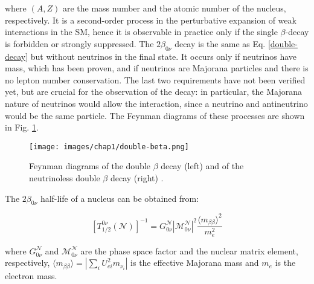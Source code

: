where $(A,Z)$ are the mass number and the atomic number of the nucleus, respectively. It is a second-order process in the perturbative expansion of weak interactions in the SM, hence it is observable in practice only if the single $\beta$-decay is forbidden or strongly suppressed. The $2\beta_{0\nu}$ decay is the same as Eq. \ref{double-decay} but without neutrinos in the final state. It occurs only if neutrinos have mass, which has been proven, and if neutrinos are Majorana particles and there is no lepton number conservation. The last two requirements have not been verified yet, but are crucial for the observation of the decay: in particular, the Majorana nature of neutrinos would allow the interaction, since a neutrino and antineutrino would be the same particle. The Feynman diagrams of these processes are shown in Fig. \ref{fig:double-beta}.

\begin{figure}
    \centering
    \texttt{[image: images/chap1/double-beta.png]}
    \caption{Feynman diagrams of the double $\beta$ decay (left) and of the neutrinoless double $\beta$ decay (right) \cite{double-beta}.}
    \label{fig:double-beta}
\end{figure}

The $2\beta_{0\nu}$ half-life of a nucleus can be obtained from:

\begin{equation}
\label{half-life}
    [T^{0\nu}_{1/2}(\mathcal{N})]^{-1} = G^\mathcal{N}_{0\nu}|\mathcal{M}^\mathcal{N}_{0\nu}|^2\frac{\langle m_{\beta \beta}\rangle^2}{m_e^2}
\end{equation}

where $G^\mathcal{N}_{0\nu}$ and $\mathcal{M}^\mathcal{N}_{0\nu}$ are the phase space factor and the nuclear matrix element, respectively, $\langle m_{\beta \beta} \rangle = |\sum_i U^2_{ei} m_{\nu_i}|$ is the effective Majorana mass and $m_e$ is the electron mass.

